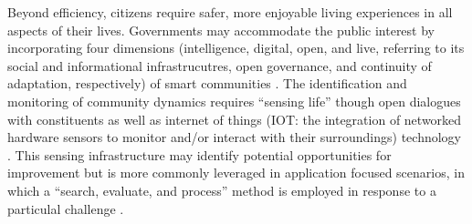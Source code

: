 Beyond efficiency, citizens require safer, more enjoyable living experiences in all aspects of their lives. Governments may accommodate the public interest \cite{Afzalan2017}  %
by incorporating four dimensions (intelligence, digital, open, and live, referring to its social and informational infrastrucutres, open governance, and continuity of adaptation, respectively) of  smart communities \cite{Oliveira2021}. %
The identification and monitoring of community dynamics requires ``sensing life'' though open dialogues with constituents as well as internet of things (IOT: the integration of networked hardware sensors to monitor and/or interact with their surroundings) technology \cite{Roche2012}. %
This sensing infrastructure may identify potential opportunities for improvement but is more commonly leveraged in application focused scenarios, in which a ``search, evaluate, and process'' method is employed in response to a particulal challenge \cite{Jiang2020}. %


